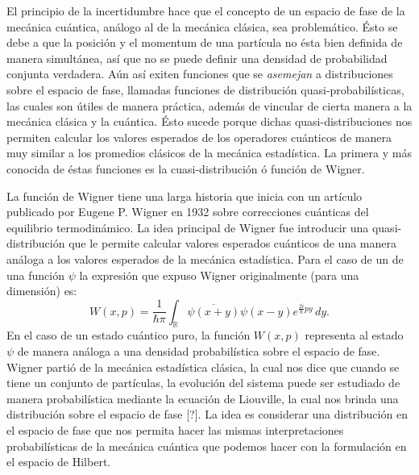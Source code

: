 \documentclass[a4paper]{report}
\DeclareMathOperator{\R}{\mathbb{R}}
\begin{document}
  El principio de la incertidumbre hace que el concepto de
  un espacio de fase de la mecánica cuántica, análogo al de
  la mecánica clásica, sea problemático. Ésto se debe a que
  la posición y el momentum de una partícula no ésta bien
  definida de manera simultánea, así que no se puede definir
  una densidad de probabilidad conjunta verdadera. Aún así
  exiten funciones que se \textit{asemejan} a distribuciones
  sobre el espacio de fase, llamadas funciones de
  distribución quasi-probabilísticas, las cuales son útiles
  de manera práctica, además de vincular de cierta manera a
  la mecánica clásica y la cuántica. Ésto sucede porque
  dichas quasi-distribuciones nos permiten calcular los
  valores esperados de los operadores cuánticos de manera
  muy similar a los promedios clásicos de la mecánica
  estadística. La primera y más conocida de éstas funciones
  es la cuasi-distribución ó función de Wigner.

  La función de Wigner tiene una larga historia que inicia
  con un artículo publicado por Eugene P. Wigner en 1932
  \cite{wignerQuantumCorrectionThermodynamic1932} sobre
  correcciones cuánticas del equilibrio termodinámico. La
  idea principal de Wigner fue introducir una
  quasi-distribución que le permite calcular valores
  esperados cuánticos de una manera análoga a los valores
  esperados de la mecánica estadística. Para el caso de un
  de una función $\psi$ la expresión que expuso Wigner
  originalmente (para una dimensión) es:
  \begin{equation}
    \label{eqn:wigners_original}
    W(x,p)
    = \frac{1}{\hbar \pi} \int_{\R}
    \overline{\psi(x+y)}\psi(x-y) e^{\frac{2i}{\hbar}py} \,
    dy.
  \end{equation}
  En el caso de un estado cuántico puro, la función $W(x,p)$
  representa al estado $\psi$ de manera análoga a una
  densidad probabilística sobre el espacio de fase. Wigner
  partió de la mecánica estadística clásica, la cual nos
  dice que cuando se tiene un conjunto de partículas, la
  evolución del sistema puede ser estudiado de manera
  probabilística mediante la ecuación de Liouville, la cual
  nos brinda una distribución sobre el espacio de fase [?].
  La idea es considerar una distribución en el espacio de
  fase que nos permita hacer las mismas interpretaciones
  probabilísticas de la mecánica cuántica que podemos hacer
  con la formulación en el espacio de Hilbert.
\end{document}
